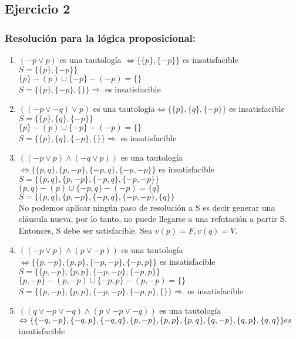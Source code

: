 \documentclass[10pt,a4paper]{article}
\begin{document}
\subsection{Ejercicio 2}
  \subsubsection{Resolución para la lógica proposicional:}
    \begin{enumerate}
        \item $(-p \lor p)$ es una tautología $  \Leftrightarrow \{\{p\},\{-p\}\} $ es insatisfacible \\
        $S=\{\{p\},\{-p\}\}$ \\
        $\{p\}-(p) \cup \{-p\}-(-p)=\{\}$ \\
        $S=\{\{p\},\{-p\},\{\}\} \Rightarrow $ es insatisfacible
        \item $((-p \lor -q) \lor p) $ es una tautología$ \Leftrightarrow \{\{p\},\{q\},\{-p\}\} $ es insatisfacible \\
        $S=\{\{p\},\{q\},\{-p\}\}$ \\
        $\{p\}-(p) \cup \{-p\}-(-p)=\{\}$ \\
        $S=\{\{p\},\{q\},\{-p\},\{\}\} \Rightarrow $ es insatisfacible
        \item $((-p \lor p)\land(-q \lor p))$ es una tautología $ \Leftrightarrow \{\{p, q\},\{p, -p\},\{-p, q\},\{-p, -p\}\} $ es insatisfacible \\
        $S=\{\{p, q\},\{p, -p\},\{-p, q\},\{-p, -p\}\}$ \\
        $\{p, q\}-(p) \cup \{-p, q\}-(-p)=\{q\}$ \\
        $S=\{\{p, q\},\{p, -p\},\{-p, q\},\{-p, -p\},\{q\}\}$ \\
        No podemos aplicar ningún paso de resolución a S es decir generar una cláusula nueva, por lo tanto, no puede llegarse a una refutación a partir S. Entonces, S debe ser satisfacible. Sea $v(p)=F,v(q)=V$.
        \item $((-p \lor p)\land(p \lor -p))$ es una tautología $ \Leftrightarrow \{\{p, -p\},\{p, p\},\{-p, -p\},\{-p, p\}\} $ es insatisfacible \\
        $S=\{\{p, -p\},\{p, p\},\{-p, -p\},\{-p, p\}\}$ \\
        $\{p, -p\}-(p,-p) \cup \{-p, p\}-(p,-p)=\{\}$ \\
        $S=\{\{p, -p\},\{p, p\},\{-p, -p\},\{-p, p\},\{\}\} \Rightarrow $ es insatisfacible
        \item $((q \lor -p \lor -q)\land(p \lor -p \lor -q))$ es una tautología $ \Leftrightarrow \{\{-q, -p\},\{-q, p\},\{-q, q\},\{p, -p\}, \\ \{p, p\},\{p, q\},\{q, -p\},\{q, p\},\{q, q\}\} es$ insatisfacible

\end{enumerate}
\end{document}
